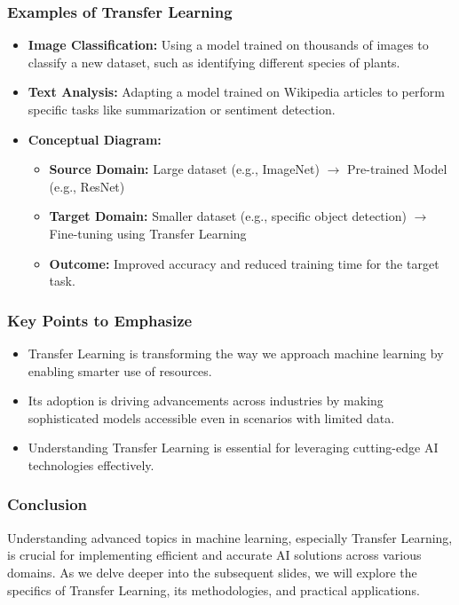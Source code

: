 \documentclass[aspectratio=169]{beamer}
\begin{document}
\begin{frame}[fragile]
    \frametitle{Examples of Transfer Learning}
    \begin{itemize}
        \item \textbf{Image Classification:} 
        Using a model trained on thousands of images to classify a new dataset, such as identifying different species of plants.
        
        \item \textbf{Text Analysis:} 
        Adapting a model trained on Wikipedia articles to perform specific tasks like summarization or sentiment detection.
        
        \item \textbf{Conceptual Diagram:}
        \begin{itemize}
            \item \textbf{Source Domain:} Large dataset (e.g., ImageNet) $\rightarrow$ Pre-trained Model (e.g., ResNet)
            \item \textbf{Target Domain:} Smaller dataset (e.g., specific object detection) $\rightarrow$ Fine-tuning using Transfer Learning
            \item \textbf{Outcome:} Improved accuracy and reduced training time for the target task.
        \end{itemize}
    \end{itemize}
\end{frame}

\begin{frame}[fragile]
    \frametitle{Key Points to Emphasize}
    \begin{itemize}
        \item Transfer Learning is transforming the way we approach machine learning by enabling smarter use of resources.
        \item Its adoption is driving advancements across industries by making sophisticated models accessible even in scenarios with limited data.
        \item Understanding Transfer Learning is essential for leveraging cutting-edge AI technologies effectively.
    \end{itemize}
\end{frame}

\begin{frame}[fragile]
    \frametitle{Conclusion}
    Understanding advanced topics in machine learning, especially Transfer Learning, is crucial for implementing efficient and accurate AI solutions across various domains. As we delve deeper into the subsequent slides, we will explore the specifics of Transfer Learning, its methodologies, and practical applications.
\end{frame}
\end{document}
